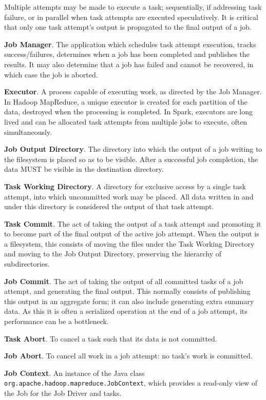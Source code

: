 \documentclass[conference]{IEEEtran}
\begin{document}
Multiple attempts may be made to execute a task;
sequentially, if addressing task failure, or in parallel when task attempts are
executed speculatively.
It is critical that only one task attempt's output is propagated
to the final output of a job.


\textbf{Job Manager}.
The application which schedules task attempt execution, tracks success/failures,
determines when a job has been completed and publishes the results.
It may also determine that a job has failed and cannot be recovered,
in which case the job is aborted.

\textbf{Executor}.
A process capable of executing work, as directed by the Job Manager.
In Hadoop MapReduce, a unique executor is created for each partition
of the data, destroyed when the processing is completed.
In Spark, executors are long lived and can be allocated task attempts from multiple
jobs to execute, often simultaneously.

\textbf{Job Output Directory}.
The directory into which the output of a job writing to the filesystem is placed
so as to be visible.
After a successful job completion, the data MUST be visible in the destination
directory.

\textbf{Task Working Directory}.
A directory for exclusive access by a single task attempt, into which uncommitted
work may be placed.
All data written in and under this directory is considered the output of
that task attempt.


\textbf{Task Commit}.
The act of taking the output of a task attempt
and promoting it to become part of the final output of the active job
attempt.
When the output is a filesystem, this consists of moving the files
under the Task Working Directory and moving to the Job Output Directory,
preserving the hierarchy of subdirectories.


\textbf{Job Commit}.
The act of taking the output of all committed tasks of a job attempt,
and generating the final output.
This normally consists of publishing this output in an aggregate form;
it can also include generating extra summary data.
As this it is often a serialized operation at the end of a job attempt,
its performance can be a bottleneck.

\textbf{Task Abort}.
To cancel a task such that its data is not committed.

\textbf{Job Abort}.
To cancel all work in a job attempt: no task's work is committed.


\textbf{Job Context}.
An instance of the Java class \texttt{org.apache.hadoop.mapreduce.JobContext},
which provides a read-only view of the Job for the Job Driver and tasks.
\end{document}
